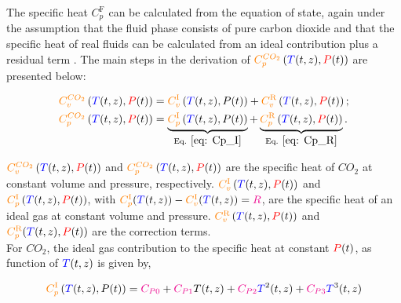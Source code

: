\documentclass[../Article_Model_Parameters.tex]{subfiles}
\begin{document}
	The specific heat $C_p^{\text{F}}$ can be calculated from the equation of state, again under the assumption that the fluid phase consists of pure carbon dioxide and that the specific heat of real fluids can be calculated from an ideal contribution plus a residual term \citet{Pratt2001}. The main steps in the derivation of ${\color{orange}C^{CO_2}_p}\left({\color{blue}T}(t,z), {\color{red}P}(t)\right)$ are presented below: 
	
	{\footnotesize
	\begin{subequations}\begin{align}
			{\color{orange}C^{CO_2}_v}\left({\color{blue}T}(t,z), {\color{red}P}(t)\right) & = {\color{orange}C_v^{\text{I}}}\left({\color{blue}T}(t,z),P(t)\right) + {\color{orange}C_v^{\text{R}}}\left({\color{blue}T}(t,z), {\color{red}P}(t)\right) \label{eq: Cv_CO2}; \\ 
			{\color{orange}C^{CO_2}_p}\left({\color{blue}T}(t,z), {\color{red}P}(t)\right) & = \underbrace{{\color{orange}C_p^{\text{I}}}\left({\color{blue}T}(t,z),P(t)\right)}_{\text{Eq. } \eqref{eq: Cp_I}} + \underbrace{{\color{orange}C_p^{\text{R}}}\left({\color{blue}T}(t,z), {\color{red}P}(t)\right)}_{\text{Eq. } \eqref{eq: Cp_R}}  \label{eq: Cp_CO2}.
	\end{align}\end{subequations} }

	${\color{orange}C^{CO_2}_v}\left({\color{blue}T}(t,z), {\color{red}P}(t)\right)$ and ${\color{orange}C^{CO_2}_p}\left({\color{blue}T}(t,z), {\color{red}P}(t)\right)$ are the specific heat of $CO_2$ at constant volume and pressure, respectively. ${\color{orange}C_v^{\text{I}}}\left({\color{blue}T}(t,z), {\color{red}P}(t)\right)$ and ${\color{orange}C_p^{\text{I}}}\left({\color{blue}T}(t,z), {\color{red}P}(t)\right)$, with ${\color{orange}C_p^{\text{I}}}({\color{blue}T}(t,z)) - {\color{orange}C_v^{\text{I}}}({\color{blue}T}(t,z)) = {\color{magenta}R}$, are the specific heat of an ideal gas at constant volume and pressure. ${\color{orange}C_v^{\text{R}}}\left({\color{blue}T}(t,z), {\color{red}P}(t)\right)$ and ${\color{orange}C_p^{\text{R}}}({\color{blue}T}(t,z), {\color{red}P}(t))$ are the correction terms. \\
	
	For $CO_2$, the ideal gas contribution to the specific heat at constant ${\color{red}P}(t)$, as function of ${\color{blue}T}(t,z)$ is given by,
	
	{\footnotesize
	\begin{equation}
		{\color{orange}C_p^{\text{I}}}\left({\color{blue}T}(t,z),P(t)\right) = {\color{magenta}C_{P0}} + {\color{magenta}C_{P1}}T(t,z) + {\color{magenta}C_{P2}}{\color{blue}T}^2(t,z) + {\color{magenta}C_{P3}}{\color{blue}T}^3(t,z) \label{eq: Cp_I}
	\end{equation} }
\end{document}

